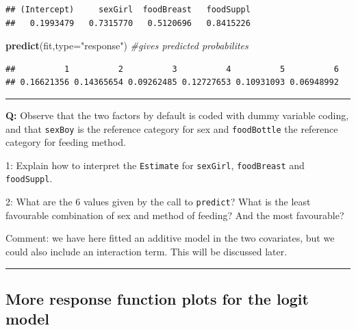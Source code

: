 \documentclass[
]{article}
\newenvironment{Shaded}{\begin{snugshade}}{\end{snugshade}}
\newcommand{\AttributeTok}[1]{\textcolor[rgb]{0.13,0.29,0.53}{#1}}
\newcommand{\CommentTok}[1]{\textcolor[rgb]{0.56,0.35,0.01}{\textit{#1}}}
\newcommand{\FunctionTok}[1]{\textcolor[rgb]{0.13,0.29,0.53}{\textbf{#1}}}
\newcommand{\NormalTok}[1]{#1}
\newcommand{\SpecialCharTok}[1]{\textcolor[rgb]{0.81,0.36,0.00}{\textbf{#1}}}
\newcommand{\StringTok}[1]{\textcolor[rgb]{0.31,0.60,0.02}{#1}}
\begin{document}
\begin{Shaded}
\end{Shaded}

\begin{verbatim}
## (Intercept)     sexGirl  foodBreast   foodSuppl 
##   0.1993479   0.7315770   0.5120696   0.8415226
\end{verbatim}

\begin{Shaded}
\begin{Highlighting}[]
\FunctionTok{predict}\NormalTok{(fit,}\AttributeTok{type=}\StringTok{"response"}\NormalTok{) }\CommentTok{\#gives predicted probabilites}
\end{Highlighting}
\end{Shaded}

\begin{verbatim}
##          1          2          3          4          5          6 
## 0.16621356 0.14365654 0.09262485 0.12727653 0.10931093 0.06948992
\end{verbatim}

\normalsize

\begin{center}\rule{0.5\linewidth}{0.5pt}\end{center}

\textbf{Q:} Observe that the two factors by default is coded with dummy
variable coding, and that \texttt{sexBoy} is the reference category for
sex and \texttt{foodBottle} the reference category for feeding method.

1: Explain how to interpret the \texttt{Estimate} for \texttt{sexGirl},
\texttt{foodBreast} and \texttt{foodSuppl}.

2: What are the 6 values given by the call to \texttt{predict}? What is
the least favourable combination of sex and method of feeding? And the
most favourable?

Comment: we have here fitted an additive model in the two covariates,
but we could also include an interaction term. This will be discussed
later.

\begin{center}\rule{0.5\linewidth}{0.5pt}\end{center}

\hypertarget{more-response-function-plots-for-the-logit-model}{%
\subsection{More response function plots for the logit
model}\label{more-response-function-plots-for-the-logit-model}}
\end{document}
